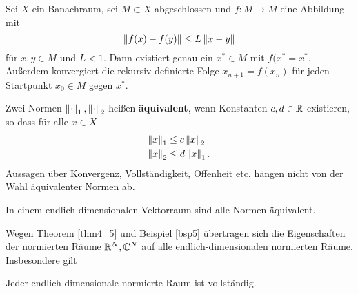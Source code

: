 \begin{thm}\label{thm4_4}
	Sei $X$ ein Banachraum, sei $M \subset X$ abgeschlossen und $f \colon M \to M$ eine Abbildung mit
	\[\left\lVert f(x) - f(y)\right\rVert \leq L \left\lVert x-y\right\rVert\]
	für $x,y \in M$ und $L<1$. Dann existiert genau ein $x^* \in M$ mit $f(x^* = x^*$. Außerdem konvergiert die rekursiv definierte Folge $x_{n+1} = f(x_n)$ für jeden Startpunkt $x_0 \in M$ gegen $x^*$.
\end{thm}
Zwei Normen $\left\lVert\cdot\right\rVert_1, \left\lVert\cdot\right\rVert_2$ heißen \textbf{äquivalent}, wenn Konstanten $c,d \in \mathbb{R}$ existieren, so dass für alle $x \in X$
\begin{align*}
	\left\lVert x\right\rVert_1 &\leq c \left\lVert x\right\rVert_2\\
	\left\lVert x\right\rVert_2 &\leq d \left\lVert x\right\rVert_1.
\end{align*}
Aussagen über Konvergenz, Vollständigkeit, Offenheit etc. hängen nicht von der Wahl äquivalenter Normen ab.
\begin{thm}\label{thm4_5}
	In einem endlich-dimensionalen Vektorraum sind alle Normen äquivalent.
\end{thm}
Wegen Theorem \ref{thm4_5} und Beispiel \ref{bsp5} übertragen sich die Eigenschaften der normierten Räume $\mathbb{R}^N, \mathbb{C}^N$ auf alle endlich-dimensionalen normierten Räume. Insbesondere gilt
\begin{satz}\label{satz4_6}
	Jeder endlich-dimensionale normierte Raum ist vollständig.
\end{satz}
